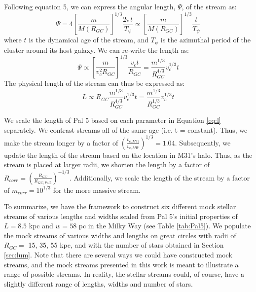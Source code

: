 \documentclass[twocolumn]{aastex62}
\newcommand{\todo}[1]{{\color{red} TODO: #1}}
\begin{document}
Following \citet{johnston01} equation 5, we can express the angular length, $\Psi$, of the stream as:
\begin{equation}
\Psi = 4  \left[\frac{m}{M(R_{GC})}\right]^{1/3}  \frac{2 \pi t}{T_{\psi}} \propto \left[\frac{m}{M(R_{GC})}\right]^{1/3}  \frac{t}{T_{\psi}}
\end{equation}
where $t$ is the dynamical age of the stream, and $T_{\psi}$ is the azimuthal period of the cluster around its host galaxy. We can re-write the length as:
\begin{equation}
\Psi \propto \left[\frac{m }{v_c^2 R_{GC}}\right]^{1/3}  \frac{v_c t }{R_{GC}} = \frac{m^{1/3}}{R_{GC}^{4/3}} v_c^{1/3}t
\end{equation}
The physical length of the stream can thus be expressed as:
\begin{equation}
\label{eq:l}
L \propto R_{GC} \frac{m^{1/3}}{R_{GC}^{4/3}} v_c^{1/3}t = \frac{m^{1/3}}{R_{GC}^{1/3}} v_c^{1/3}t
\end{equation}

We scale  the length of Pal 5 based on each parameter in Equation \ref{eq:l} separately. We contrast streams all of the same age (i.e.  t = constant). Thus, we make the stream longer by a factor of $(\frac{v_{c,M31}}{v_{c,MW}})^{1/3} = 1.04$. Subsequently, we update the length of the stream based on the location in M31's halo. Thus, as the stream is placed at larger radii, we shorten the length by a factor of  $R_{corr} = \left(\frac{R_{GC}}{R_{GC,Pal5}}\right)^{-1/3}$. %
Additionally, we scale the length of the stream by a factor of $m_{corr} = 10^{1/3}$ for the more massive stream. 

To summarize, we have the framework to construct six different mock stellar streams of various lengths and widths scaled from Pal 5's initial properties of $L = 8.5$ kpc and $w = 58$ pc in the Milky Way (see Table \ref{tab:Pal5}). We populate the mock streams of various widths and lengths on great circles with radii of $R_{GC} =$ 15, 35, 55 kpc, and with the number of stars obtained in Section \ref{sec:lum}. Note that there are several ways we could have constructed mock streams, and the mock streams presented in this work is meant to illustrate a range of possible streams. In reality, the stellar streams could, of course, have a slightly different range of lengths, widths and number of stars.
\end{document}
